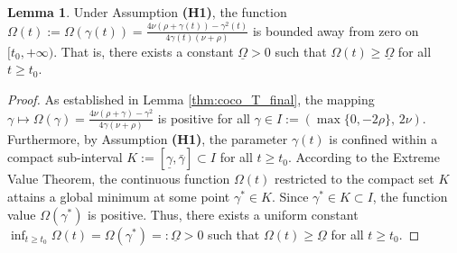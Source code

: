 \documentclass{article}
\theoremstyle{definition}
\newtheorem{lemma}{Lemma}[section]
\theoremstyle{definition}
\theoremstyle{definition}
\begin{document}
\begin{lemma}
\label{prop:omega_uniform_positivity}
Under Assumption {\bf (H1)}, the function 
$\Omega(t) := \Omega(\gamma(t)) = \frac{4\nu(\rho + \gamma(t)) - \gamma^2(t)}{4\gamma(t)(\nu + \rho)}$ 
is bounded away from zero on $[t_0, +\infty)$. That is, there exists a constant $\underline{\Omega} > 0$ such that $\Omega(t) \ge \underline{\Omega}$ for all $t \ge t_0$.
\end{lemma}

\begin{proof}
As established in Lemma \ref{thm:coco_T_final},  the mapping $\gamma\mapsto\Omega(\gamma)=\frac{4\nu \left( \rho + \gamma \right) - \gamma^2}{4\gamma \left( \nu + \rho \right)}$ is positive for all $\gamma \in I := \left( \max\{0, -2\rho\}, \, 2\nu \right)$. Furthermore, by Assumption {\rm {\bf (H1)}}, the parameter $\gamma(t)$ is confined within a compact sub-interval $K := [\underline{\gamma}, \bar{\gamma}] \subset I$ for all $t \geq t_0$. According to the Extreme Value Theorem, the continuous function $\Omega(t)$ restricted to the compact set $K$ attains a global minimum at some point $\gamma^* \in K$. Since $\gamma^* \in K \subset I$, the function value $\Omega(\gamma^*)$ is positive. Thus, there exists a uniform constant $\inf_{t \geq t_0} \Omega(t) = \Omega(\gamma^*) =: \underline{\Omega} > 0$ such that $\Omega(t) \ge \underline{\Omega}$ for all $t \ge t_0$. 
\end{proof}
\end{document}
